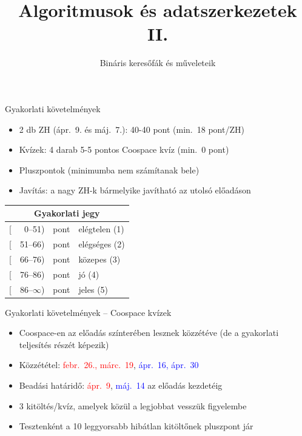 \documentclass{beamer}
\institute{Szegedi Tudományegyetem}
\title{Algoritmusok és adatszerkezetek II.}
\subtitle{Bináris keresőfák és műveleteik}
\date{}
\begin{document}
\maketitle

\begin{frame}{Gyakorlati követelmények}
	\begin{itemize}
		\item 2 db ZH (ápr.~9. és máj.~7.): 40-40 pont (min.~18 pont/ZH)
		\item Kvízek: 4 darab 5-5 pontos Coospace kvíz (min.~0 pont)
		\item Pluszpontok (minimumba nem számítanak bele)
		\item Javítás: a nagy ZH-k bármelyike javítható az utolsó előadáson
	\end{itemize}
	\pause
	\begin{table}
	\centering
	\begin{tabular}{r@{}r@{ }l|l}
		\multicolumn{4}{c}{Gyakorlati jegy} \\ \hline
		{[}&0--51)  & pont & elégtelen (1) \\
		{[}&51--66) & pont & elégséges (2) \\
		{[}&66--76) & pont & közepes (3) \\
		{[}&76--86) & pont & jó (4) \\
		{[}&86--$\infty$) & pont & jeles (5)
	\end{tabular}
    \end{table}
\end{frame}

\begin{frame}{Gyakorlati követelmények -- Coospace kvízek}
	\begin{itemize}
		\item Coospace-en az előadás színterében lesznek közzétéve (de a gyakorlati teljesítés részét képezik)
		\item Közzététel: \textcolor{red}{febr.~26., márc.~19}, \textcolor{blue}{ápr.~16, ápr.~30}
		\item Beadási határidő: \textcolor{red}{ápr.~9}, \textcolor{blue}{máj.~14} az előadás kezdetéig
		\item 3 kitöltés/kvíz, amelyek közül a legjobbat vesszük figyelembe
		\pause
		\item Tesztenként a 10 leggyorsabb hibátlan kitöltőnek pluszpont jár
	\end{itemize}
\end{frame}
\end{document}

